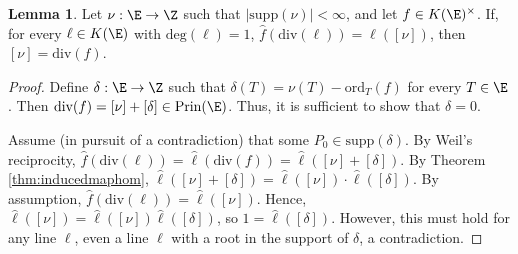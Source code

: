 \documentclass[11pt,letterpaper]{article}
\theoremstyle{definition}
\newtheorem{lemm}[theorem]{Lemma}
\newcommand{\6}{\mathbf}
\newcommand{\7}{\mathcal}
\begin{document}
\begin{lemm}
Let $\nu: \E \to \Z$ such that $\left|\text{supp}(\nu)\right| < \infty$, and let $f \in K(\E)^\times$. If, for every $\ell \in K(\E)$ with $\text{deg}(\ell) = 1$, $\widehat{f}(\text{div}(\ell)) = \ell([\nu])$, then $[\nu] = \text{div}(f)$.
\label{lem:biggestlemma}
\end{lemm}
\begin{proof}
Define $\delta: \E \to \Z$ such that $\delta(T) = \nu(T) - \text{ord}_T(f)$ for every $T \in \E$. Then $\text{div}(f)=[\nu] + [\delta] \in \text{Prin}(\E)$. Thus, it is sufficient to show that $\delta = 0$. 

Assume (in pursuit of a contradiction) that some $P_0 \in \text{supp}(\delta)$. By Weil's reciprocity, $\widehat{f}(\text{div}(\ell)) = \widehat{\ell}(\text{div}(f)) = \widehat{\ell}([\nu] + [\delta])$. By Theorem \ref{thm:inducedmaphom}, $\widehat{\ell}([\nu] + [\delta]) = \widehat{\ell}([\nu]) \cdot \widehat{\ell}([\delta])$. By assumption, $\widehat{f}(\text{div}(\ell)) = \widehat{\ell}([\nu])$. Hence, $\widehat{\ell}([\nu]) = \widehat{\ell}([\nu])\widehat{\ell}([\delta])$, so $1 = \widehat{\ell}([\delta])$. However, this must hold for any line $\ell$, even a line $\ell$ with a root in the support of $\delta$, a contradiction. 
\end{proof}
\end{document}
